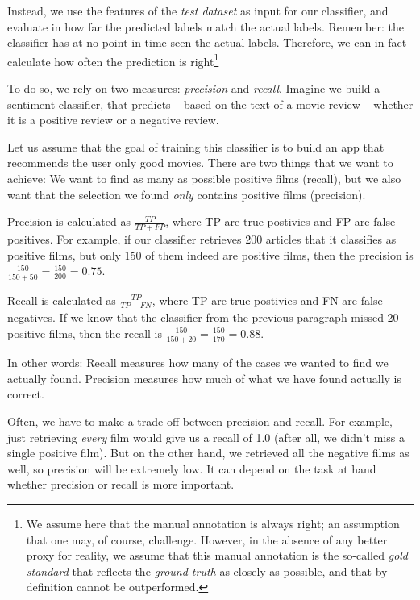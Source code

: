 Instead, we use the features of the \emph{test dataset} as input for our classifier,
and evaluate in how far the predicted labels match the actual labels.
Remember: the classifier has at no point in time seen the actual labels.
Therefore, we can in fact calculate how often the prediction is right\footnote{We
  assume here that the manual annotation is always right; an assumption that one
  may, of course, challenge. However, in the absence of any better proxy for
  reality, we assume that this manual annotation is the so-called \emph{gold standard}
  that reflects the \emph{ground truth} as closely as possible, and that by
  definition cannot be outperformed.}


To do so, we rely on two measures: \emph{precision} and \emph{recall}.
Imagine we build a sentiment classifier, that predicts -- based on the text of a movie review -- whether it is a positive review or a negative review. 

Let us assume that the goal of training this classifier is to build an app that recommends the user only good movies. There are two things that we want to achieve: We want to find as many as possible positive films (recall), but we also want that the selection we found \emph{only} contains positive films (precision).

Precision is calculated as $\frac{TP}{TP+FP}$, where TP are true postivies and FP are false positives. For example, if our classifier retrieves 200 articles that it classifies as positive films, but only 150 of them indeed are positive films, then the precision is $\frac{150}{150+50} = \frac{150}{200} = 0.75$.

Recall is calculated as $\frac{TP}{TP+FN}$, where TP are true postivies and FN are false negatives. If we know that the classifier from the previous paragraph missed 20 positive films, then the recall is $\frac{150}{150+20} = \frac{150}{170}= 0.88$.

In other words: Recall measures how many of the cases we wanted to find we actually found. Precision measures how much of what we have found actually is correct.

Often, we have to make a trade-off between precision and recall. For example, just retrieving \emph{every} film would give us a recall of 1.0 (after all, we didn't miss a single positive film). But on the other hand, we retrieved all the negative films as well, so precision will be extremely low. It can depend on the task at hand whether precision or recall is more important.





